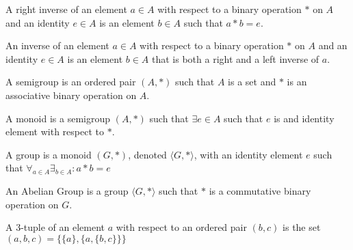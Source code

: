\documentclass[crop=false,class=book,oneside]{standalone}
\begin{document}
            \begin{definition}
                \label{Definition:MathEnc:Analysis:Sum:RightInverse}
                A right inverse of an element $a\in A$ with
                respect to a binary operation $*$
                on $A$ and an identity $e\in A$ is an element
                $b\in A$ such that $a*b=e$.
            \end{definition}
            \begin{definition}
                \label{Definition:MathEnc:Analysis:Sum:Inverse}
                An inverse of an element $a\in A$ with respect to a
                binary operation $*$ on $A$ and an identity
                $e\in A$ is an element $b\in A$ that is both a
                right and a left inverse of $a$.
            \end{definition}
            \begin{definition}
                \label{Definition:MathEnc:Analysis:Sum:Semigroup}
                A semigroup is an ordered pair $(A,*)$ such that
                $A$ is a set and $*$ is an associative binary
                operation on $A$.
            \end{definition}
            \begin{definition}
                \label{Definition:MathEnc:Analysis:Sum:Monoid}
                A monoid is a semigroup $(A,*)$ such that
                $\exists e\in A$ such that $e$ is
                and identity element with respect to $*$.
            \end{definition}
            \begin{definition}
                \label{Definition:MathEnc:Analysis:Sum:Group}
                A group is a monoid $(G,*)$, denoted
                $\langle G,*\rangle$, with an identity
                element $e$ such that
                $\forall_{a\in A}\exists_{b\in A}:a*b=e$ 
            \end{definition}
            \begin{definition}
                \label{Definition:MathEnc:Analysis:Sum:AbelianGroup}
                An Abelian Group is a group $\langle G,*\rangle$
                such that $*$ is a
                commutative binary operation on $G$.
            \end{definition}
            \begin{definition}
                \label{Definition:MathEnc:Analysis:Sum:3Tuple}
                A 3-tuple of an element $a$ with respect
                to an ordered pair $(b,c)$ is the
                set $(a,b,c)=\{\{a\},\{a,\{b,c\}\}\}$
            \end{definition}
\end{document}
